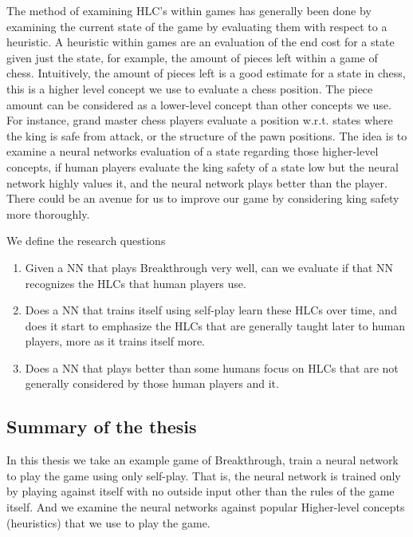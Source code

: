The method of examining HLC's within games has generally been done by examining the
current state of the game by evaluating them with respect to a heuristic. A heuristic within
games are an evaluation of the end cost for a state given just the state, for example,
the amount of pieces left within a game of chess. Intuitively, the amount of pieces
left is a good estimate for a state in chess, this is a higher level concept we
use to evaluate a chess position. The piece amount can be considered as a lower-level concept
than other concepts we use. For instance, grand master chess players evaluate a position w.r.t. states
where the king is safe from attack, or the structure of the pawn positions.
The idea is to examine a neural networks evaluation of a state regarding
those higher-level concepts, if human players evaluate the king safety of a state
low but the neural network highly values it, and the neural network plays better
than the player. There could be an avenue for us to improve our game by considering king safety more thoroughly.

We define the research questions

\begin{enumerate}
  \item Given a NN that plays Breakthrough very well, can we evaluate if that NN recognizes the 
  HLCs that human players use.
  \item Does a NN that trains itself using self-play learn these HLCs over time, and does it start to emphasize 
  the HLCs that are generally taught later to human players, more as it trains itself more.
  \item Does a NN that plays better than some humans focus on HLCs that are not generally 
  considered by those human players and it.
\end{enumerate}

\subsection{Summary of the thesis}

In this thesis we take an example game of Breakthrough, train a neural network to play the game
using only self-play. That is, the neural network is trained only by playing against
itself with no outside input other than the rules of the game itself. And we examine
the neural networks against popular Higher-level concepts (heuristics) that we use
to play the game.

